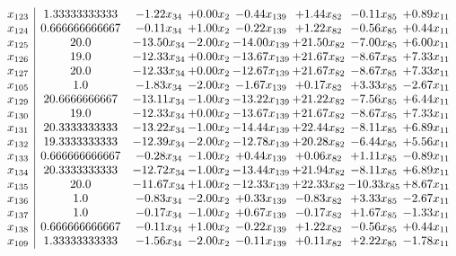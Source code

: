 \documentclass[8pt]{article}
\begin{document}
\[\begin{array}{c| c c@{\hskip 2pt} c@{\hskip 2pt} c@{\hskip 2pt} c@{\hskip 2pt} c@{\hskip 2pt} c@{\hskip 2pt} }
 x_{123}   &  1.33333333333 & -1.22 x_{34} & +  0.00 x_{2} & -0.44 x_{139} & +  1.44 x_{82} & -0.11 x_{85} & +  0.89 x_{11}\\
 x_{124}   &  0.666666666667 & -0.11 x_{34} & +  1.00 x_{2} & -0.22 x_{139} & +  1.22 x_{82} & -0.56 x_{85} & +  0.44 x_{11}\\
 x_{125}   &  20.0 & -13.50 x_{34} & -2.00 x_{2} & -14.00 x_{139} & + 21.50 x_{82} & -7.00 x_{85} & +  6.00 x_{11}\\
 x_{126}   &  19.0 & -12.33 x_{34} & +  0.00 x_{2} & -13.67 x_{139} & + 21.67 x_{82} & -8.67 x_{85} & +  7.33 x_{11}\\
 x_{127}   &  20.0 & -12.33 x_{34} & +  0.00 x_{2} & -12.67 x_{139} & + 21.67 x_{82} & -8.67 x_{85} & +  7.33 x_{11}\\
 x_{105}   &  1.0 & -1.83 x_{34} & -2.00 x_{2} & -1.67 x_{139} & +  0.17 x_{82} & +  3.33 x_{85} & -2.67 x_{11}\\
 x_{129}   &  20.6666666667 & -13.11 x_{34} & -1.00 x_{2} & -13.22 x_{139} & + 21.22 x_{82} & -7.56 x_{85} & +  6.44 x_{11}\\
 x_{130}   &  19.0 & -12.33 x_{34} & +  0.00 x_{2} & -13.67 x_{139} & + 21.67 x_{82} & -8.67 x_{85} & +  7.33 x_{11}\\
 x_{131}   &  20.3333333333 & -13.22 x_{34} & -1.00 x_{2} & -14.44 x_{139} & + 22.44 x_{82} & -8.11 x_{85} & +  6.89 x_{11}\\
 x_{132}   &  19.3333333333 & -12.39 x_{34} & -2.00 x_{2} & -12.78 x_{139} & + 20.28 x_{82} & -6.44 x_{85} & +  5.56 x_{11}\\
 x_{133}   &  0.666666666667 & -0.28 x_{34} & -1.00 x_{2} & +  0.44 x_{139} & +  0.06 x_{82} & +  1.11 x_{85} & -0.89 x_{11}\\
 x_{134}   &  20.3333333333 & -12.72 x_{34} & -1.00 x_{2} & -13.44 x_{139} & + 21.94 x_{82} & -8.11 x_{85} & +  6.89 x_{11}\\
 x_{135}   &  20.0 & -11.67 x_{34} & +  1.00 x_{2} & -12.33 x_{139} & + 22.33 x_{82} & -10.33 x_{85} & +  8.67 x_{11}\\
 x_{136}   &  1.0 & -0.83 x_{34} & -2.00 x_{2} & +  0.33 x_{139} & -0.83 x_{82} & +  3.33 x_{85} & -2.67 x_{11}\\
 x_{137}   &  1.0 & -0.17 x_{34} & -1.00 x_{2} & +  0.67 x_{139} & -0.17 x_{82} & +  1.67 x_{85} & -1.33 x_{11}\\
 x_{138}   &  0.666666666667 & -0.11 x_{34} & +  1.00 x_{2} & -0.22 x_{139} & +  1.22 x_{82} & -0.56 x_{85} & +  0.44 x_{11}\\
 x_{109}   &  1.33333333333 & -1.56 x_{34} & -2.00 x_{2} & -0.11 x_{139} & +  0.11 x_{82} & +  2.22 x_{85} & -1.78 x_{11}\\

\end{array}\]
\end{document}
